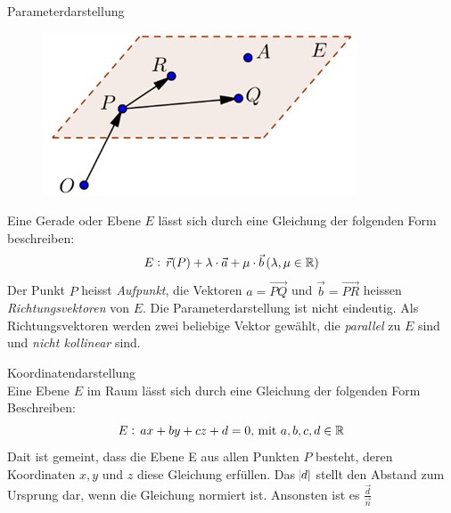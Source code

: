 \begin{definition}{Parameterdarstellung}
    \begin{figure}
        \includegraphics[width=0.9\linewidth]{vec-param.png}
    \end{figure}
    Eine Gerade oder Ebene $E$ lässt sich durch eine Gleichung der folgenden Form beschreiben:
    \begin{equation*}
        E:\,\vec{r}(P)+\lambda\cdot\vec{a}+\mu\cdot\vec{b}\, (\lambda,\mu\in\mathbb{R})
    \end{equation*}
    Der Punkt $P$ heisst \textit{Aufpunkt}, die Vektoren $a=\overrightarrow{PQ}$ und 
    $\vec{b}=\overrightarrow{PR}$ heissen \textit{Richtungsvektoren} von $E$.
    Die Parameterdarstellung ist nicht eindeutig. Als Richtungsvektoren werden zwei beliebige
    Vektor gewählt, die \textit{parallel} zu $E$ sind und \textit{nicht kollinear} sind.
\end{definition}

\begin{definition}{Koordinatendarstellung}\\
    Eine Ebene $E$ im Raum lässt sich durch eine Gleichung der folgenden Form Beschreiben:
    \begin{equation*}
        E:\,ax+by+cz+d=0,\, \text{mit } a,b,c,d\in \mathbb{R}
    \end{equation*}
    Dait ist gemeint, dass die Ebene E aus allen Punkten $P$ besteht, deren Koordinaten
    $x, y$ und $z$ diese Gleichung erfüllen.
    Das $\abs{d}$ stellt den Abstand zum Ursprung dar, wenn die Gleichung normiert ist. 
    Ansonsten ist es $\frac{\vec{d}}{\vec{n}}$ 
\end{definition}

